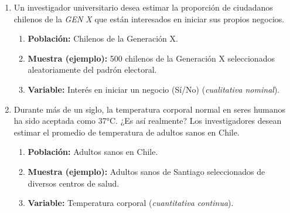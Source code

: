 \documentclass[12pt, letterpaper]{article}
\begin{document}
\begin{enumerate}
	\item Un investigador universitario desea estimar la proporción de ciudadanos chilenos de la \textit{GEN X} que están interesados en iniciar sus propios negocios.
	      \begin{enumerate}
		      \item \textbf{Población:} Chilenos de la Generación X.
		      \item \textbf{Muestra (ejemplo):} 500 chilenos de la Generación X seleccionados aleatoriamente del padrón electoral.
		      \item \textbf{Variable:} Interés en iniciar un negocio (Sí/No) (\textit{cualitativa nominal}).
	      \end{enumerate}

	\item Durante más de un siglo, la temperatura corporal normal en seres humanos ha sido aceptada como 37°C. ¿Es así realmente? Los investigadores desean estimar el promedio de temperatura de adultos sanos en Chile.
	      \begin{enumerate}
		      \item \textbf{Población:} Adultos sanos en Chile.
		      \item \textbf{Muestra (ejemplo):} Adultos sanos de Santiago seleccionados de diversos centros de salud.
		      \item \textbf{Variable:} Temperatura corporal (\textit{cuantitativa continua}).
	      \end{enumerate}


\end{enumerate}
\end{document}
